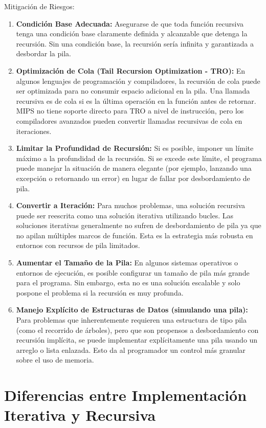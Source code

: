 \documentclass{article}
\begin{document}
 Mitigación de Riesgos:
\begin{enumerate}
    \item \textbf{Condición Base Adecuada:} Asegurarse de que toda función recursiva tenga una condición base claramente definida y alcanzable que detenga la recursión. Sin una condición base, la recursión sería infinita y garantizada a desbordar la pila.
    \item \textbf{Optimización de Cola (Tail Recursion Optimization - TRO):} En algunos lenguajes de programación y compiladores, la recursión de cola puede ser optimizada para no consumir espacio adicional en la pila. Una llamada recursiva es de cola si es la última operación en la función antes de retornar. MIPS no tiene soporte directo para TRO a nivel de instrucción, pero los compiladores avanzados pueden convertir llamadas recursivas de cola en iteraciones.
    \item \textbf{Limitar la Profundidad de Recursión:} Si es posible, imponer un límite máximo a la profundidad de la recursión. Si se excede este límite, el programa puede manejar la situación de manera elegante (por ejemplo, lanzando una excepción o retornando un error) en lugar de fallar por desbordamiento de pila.
    \item \textbf{Convertir a Iteración:} Para muchos problemas, una solución recursiva puede ser reescrita como una solución iterativa utilizando bucles. Las soluciones iterativas generalmente no sufren de desbordamiento de pila ya que no apilan múltiples marcos de función. Esta es la estrategia más robusta en entornos con recursos de pila limitados.
    \item \textbf{Aumentar el Tamaño de la Pila:} En algunos sistemas operativos o entornos de ejecución, es posible configurar un tamaño de pila más grande para el programa. Sin embargo, esta no es una solución escalable y solo pospone el problema si la recursión es muy profunda.
    \item \textbf{Manejo Explícito de Estructuras de Datos (simulando una pila):} Para problemas que inherentemente requieren una estructura de tipo pila (como el recorrido de árboles), pero que son propensos a desbordamiento con recursión implícita, se puede implementar explícitamente una pila usando un arreglo o lista enlazada. Esto da al programador un control más granular sobre el uso de memoria.
\end{enumerate}

\section{Diferencias entre Implementación Iterativa y Recursiva}
\end{document}
